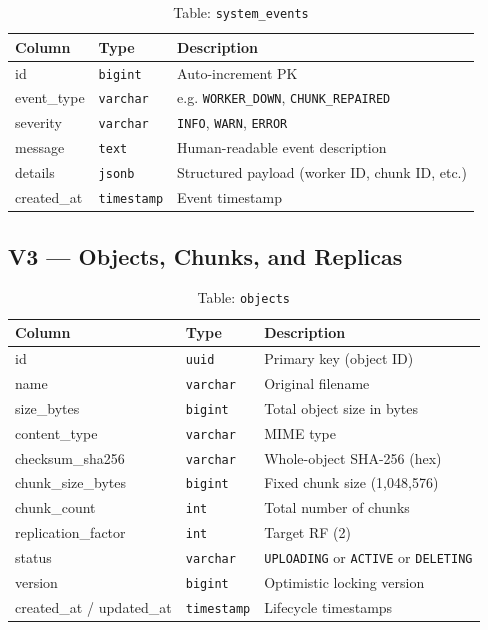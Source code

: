 \documentclass[12pt,a4paper]{report}
\begin{document}
\begin{table}[H]
  \centering
  \caption{Table: \texttt{system\_events}}
  \label{tab:events}
  \begin{tabular}{lll}
    \toprule
    \textbf{Column}   & \textbf{Type}      & \textbf{Description} \\
    \midrule
    id                & \texttt{bigint}    & Auto-increment PK \\
    event\_type       & \texttt{varchar}   & e.g. \texttt{WORKER\_DOWN}, \texttt{CHUNK\_REPAIRED} \\
    severity          & \texttt{varchar}   & \texttt{INFO}, \texttt{WARN}, \texttt{ERROR} \\
    message           & \texttt{text}      & Human-readable event description \\
    details           & \texttt{jsonb}     & Structured payload (worker ID, chunk ID, etc.) \\
    created\_at       & \texttt{timestamp} & Event timestamp \\
    \bottomrule
  \end{tabular}
\end{table}

\subsection{V3 --- Objects, Chunks, and Replicas}

\begin{table}[H]
  \centering
  \caption{Table: \texttt{objects}}
  \label{tab:objects-table}
  \begin{tabular}{lll}
    \toprule
    \textbf{Column}         & \textbf{Type}      & \textbf{Description} \\
    \midrule
    id                      & \texttt{uuid}      & Primary key (object ID) \\
    name                    & \texttt{varchar}   & Original filename \\
    size\_bytes             & \texttt{bigint}    & Total object size in bytes \\
    content\_type           & \texttt{varchar}   & MIME type \\
    checksum\_sha256        & \texttt{varchar}   & Whole-object SHA-256 (hex) \\
    chunk\_size\_bytes      & \texttt{bigint}    & Fixed chunk size (1,048,576) \\
    chunk\_count            & \texttt{int}       & Total number of chunks \\
    replication\_factor     & \texttt{int}       & Target RF (2) \\
    status                  & \texttt{varchar}   & \texttt{UPLOADING} or \texttt{ACTIVE} or \texttt{DELETING} \\
    version                 & \texttt{bigint}    & Optimistic locking version \\
    created\_at / updated\_at & \texttt{timestamp} & Lifecycle timestamps \\
    \bottomrule
  \end{tabular}
\end{table}
\end{document}
